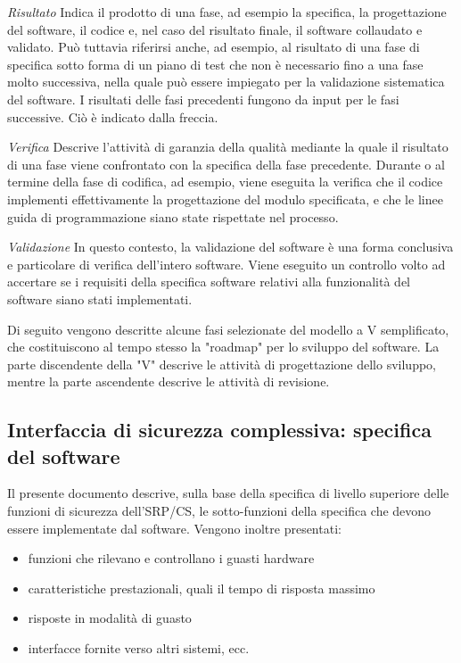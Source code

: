 \begin{center}
    \begin{minipage}{\textwidth}
        \centering
        \captionsetup{hypcap=false}
        \resizebox{0.9\textwidth}{!}{}
        \label{fig:06-11}
    \end{minipage}
\end{center}

\textit{Risultato}
Indica il prodotto di una fase, ad esempio la specifica, la progettazione del software, il codice e, nel caso del risultato finale, il software collaudato e validato. Può tuttavia riferirsi anche, ad esempio, al risultato di una fase di specifica sotto forma di un piano di test che non è necessario fino a una fase molto successiva, nella quale può essere impiegato per la validazione sistematica del software. I risultati delle fasi precedenti fungono da input per le fasi successive. Ciò è indicato dalla freccia.

\textit{Verifica}
Descrive l'attività di garanzia della qualità mediante la quale il risultato di una fase viene confrontato con la specifica della fase precedente. Durante o al termine della fase di codifica, ad esempio, viene eseguita la verifica che il codice implementi effettivamente la progettazione del modulo specificata, e che le linee guida di programmazione siano state rispettate nel processo.

\textit{Validazione}
In questo contesto, la validazione del software è una forma conclusiva e particolare di verifica dell'intero software. Viene eseguito un controllo volto ad accertare se i requisiti della specifica software relativi alla funzionalità del software siano stati implementati.

Di seguito vengono descritte alcune fasi selezionate del modello a V semplificato, che costituiscono al tempo stesso la "roadmap" per lo sviluppo del software. La parte discendente della "V" descrive le attività di progettazione dello sviluppo, mentre la parte ascendente descrive le attività di revisione.

\subsection{Interfaccia di sicurezza complessiva: specifica del software}
\label{subsec:06-3-2}
Il presente documento descrive, sulla base della specifica di livello superiore delle funzioni di sicurezza dell'SRP/CS, le sotto-funzioni della specifica che devono essere implementate dal software. Vengono inoltre presentati:
\begin{itemize}
    \item funzioni che rilevano e controllano i guasti hardware
    \item caratteristiche prestazionali, quali il tempo di risposta massimo
    \item risposte in modalità di guasto
    \item interfacce fornite verso altri sistemi, ecc.
\end{itemize}


